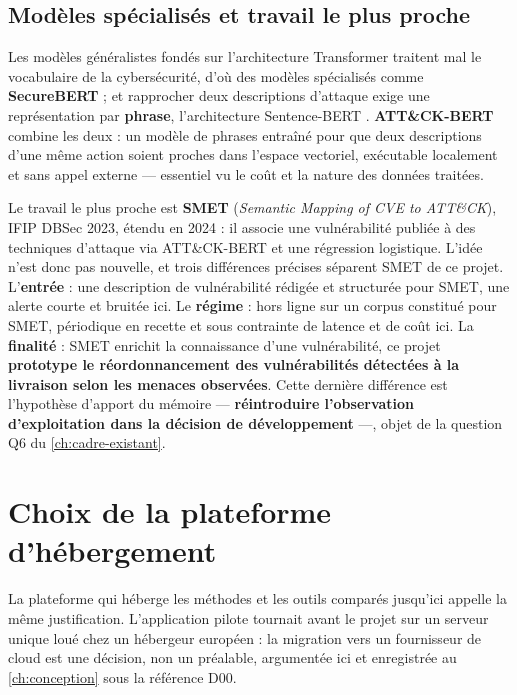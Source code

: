 \subsection{Modèles spécialisés et travail le plus proche}
\label{sec:smet-travail-proche}

Les modèles généralistes fondés sur l'architecture Transformer \cite{devlin_bert2019} traitent
mal le vocabulaire de la cybersécurité, d'où des modèles spécialisés comme \textbf{SecureBERT}
\cite{securebert2022} ; et rapprocher deux descriptions d'attaque exige une représentation par
\textbf{phrase}, l'architecture Sentence-BERT \cite{sbert2019}. \textbf{ATT\&CK-BERT} combine les
deux \cite{attackbert_model,smet2023} : un modèle de phrases entraîné pour que deux descriptions
d'une même action soient proches dans l'espace vectoriel, exécutable localement et sans appel
externe --- essentiel vu le coût et la nature des données traitées.

Le travail le plus proche est \textbf{SMET} (\emph{Semantic Mapping of CVE to ATT\&CK}), IFIP
DBSec 2023, étendu en 2024 \cite{smet2024} : il associe une vulnérabilité publiée à des techniques
d'attaque via ATT\&CK-BERT et une régression logistique. L'idée n'est donc pas nouvelle, et trois
différences précises séparent SMET de ce projet. L'\textbf{entrée} : une description de
vulnérabilité rédigée et structurée pour SMET, une alerte courte et bruitée ici. Le
\textbf{régime} : hors ligne sur un corpus constitué pour SMET, périodique en recette et sous
contrainte de latence et de coût ici. La \textbf{finalité} : SMET enrichit la connaissance d'une
vulnérabilité, ce projet \textbf{prototype le réordonnancement des vulnérabilités détectées à la
livraison selon les menaces observées}. Cette dernière différence est l'hypothèse d'apport du
mémoire --- \textbf{réintroduire l'observation d'exploitation dans la décision de développement}
---, objet de la question Q6 du \cref{ch:cadre-existant}.

\section{Choix de la plateforme d'hébergement}
\label{sec:choix-plateforme}

\label{sec:plateforme-criteres}
\label{sec:plateforme-decision}

La plateforme qui héberge les méthodes et les outils comparés jusqu'ici appelle la même
justification. L'application pilote tournait avant le projet sur un serveur unique loué chez un
hébergeur européen : la migration vers un fournisseur de cloud est une décision, non un préalable,
argumentée ici et enregistrée au \cref{ch:conception} sous la référence D00.

